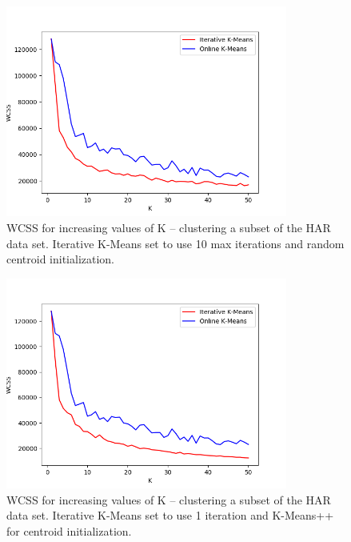 \documentclass{l4proj}
\begin{document}
\begin{appendices}
\begin{figure}[H]
	\centering
    \includegraphics[width=0.825\textwidth]{images/result3}
    \caption{WCSS for increasing values of K -- clustering a subset of the HAR data set. Iterative K-Means set to use 10 max iterations and random centroid initialization. }
    \label{fig:res3}
\end{figure}

\begin{figure}[H]
	\centering
    \includegraphics[width=0.825\textwidth]{images/result4}
    \caption{WCSS for increasing values of K -- clustering a subset of the HAR data set. Iterative K-Means set to use 1 iteration and K-Means++ for centroid initialization. } 
    \label{fig:res4}
\end{figure}


\end{appendices}
\end{document}
